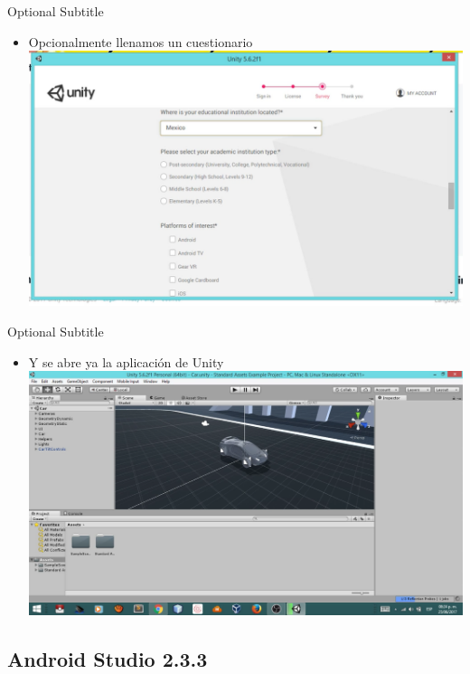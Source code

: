 \documentclass{beamer}
\begin{document}
\begin{frame}{09}{Optional Subtitle}
  \begin{itemize}
  \item {
    Opcionalmente llenamos un cuestionario
  }
  \includegraphics[width=\linewidth]{image/IU09}
  \end{itemize}
\end{frame}

\begin{frame}{10}{Optional Subtitle}
  \begin{itemize}
  \item {
    Y se abre ya la aplicación de Unity
  }
  \includegraphics[width=\linewidth]{image/IU10}
  \end{itemize}
\end{frame}

\subsection{Android Studio 2.3.3}
\end{document}
